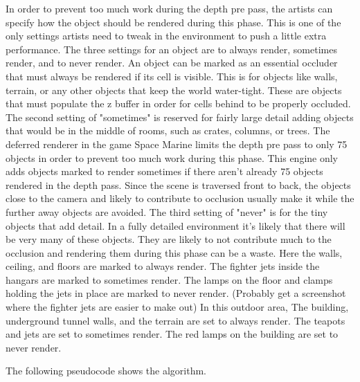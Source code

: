 \documentclass[12pt]{ucthesis}
\begin{document}

In order to prevent too much work during the depth pre pass, the artists can specify how the object should be rendered during this phase.
This is one of the only settings artists need to tweak in the environment to push a little extra performance.
The three settings for an object are to always render, sometimes render, and to never render.
An object can be marked as an essential occluder that must always be rendered if its cell is visible.
This is for objects like walls, terrain, or any other objects that keep the world water-tight.
These are objects that must populate the z buffer in order for cells behind to be properly occluded.
The second setting of "sometimes" is reserved for fairly large detail adding objects that would be in the middle of rooms, such as crates, columns, or trees.
The deferred renderer in the game Space Marine limits the depth pre pass to only 75 objects in order to prevent too much work during this phase. %
This engine only adds objects marked to render sometimes if there aren't already 75 objects rendered in the depth pass.
Since the scene is traversed front to back, the objects close to the camera and likely to contribute to occlusion usually make it while the further away objects are avoided.
The third setting of "never" is for the tiny objects that add detail.
In a fully detailed environment it's likely that there will be very many of these objects.
They are likely to not contribute much to the occlusion and rendering them during this phase can be a waste.
Here the walls, ceiling, and floors are marked to always render.
The fighter jets inside the hangars are marked to sometimes render.
The lamps on the floor and clamps holding the jets in place are marked to never render. (Probably get a screenshot where the fighter jets are easier to make out)
In this outdoor area, The building, underground tunnel walls, and the terrain are set to always render.
The teapots and jets are set to sometimes render.
The red lamps on the building are set to never render.

The following pseudocode shows the algorithm.
\end{document}
